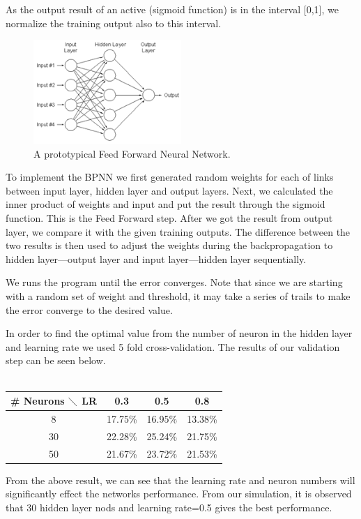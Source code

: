 \documentclass[10pt,twocolumn]{article}
\begin{document}
As the output result of an active (sigmoid function) is in the interval [0,1], we normalize the training output also to this interval.
\begin{figure}
\includegraphics[width=0.5\textwidth]{./image.png}
\caption{A prototypical Feed Forward Neural Network.}
\end{figure}
To implement the BPNN we first generated random weights for each of links between input layer, hidden layer and output layers. Next, we calculated the inner product of weights and input and put the result through the sigmoid function. This is the Feed Forward step. After we got the result from output layer, we compare it with the given training outputs. The difference between the two results is then used to adjust the weights during the backpropagation to hidden layer---output layer and input layer---hidden layer sequentially.

We runs the program until the error converges. Note that since we are starting with a random set of weight and threshold, it may take a series of trails to make the error converge to the desired value.

In order to find the optimal value from the number of neuron in the hidden layer and learning rate we used 5 fold cross-validation. The results of our validation step can be seen below. 
\\
\\
\begin{tabular}{|c|c|c|c|}
\hline
 \# Neurons $\diagdown$ LR & 0.3 & 0.5 & 0.8 \\ \hline
 8 & 17.75\% &  16.95\% & 13.38\% \\
 30 & 22.28\% & 25.24\% & 21.75\% \\
 50 & 21.67\% & 23.72\% & 21.53\% \\ \hline
\end{tabular}

From the above result, we can see that the learning rate and neuron numbers will significantly effect the networks performance.  From our simulation, it is observed that 30 hidden layer nods and learning rate=0.5 gives the best performance.
\end{document}

